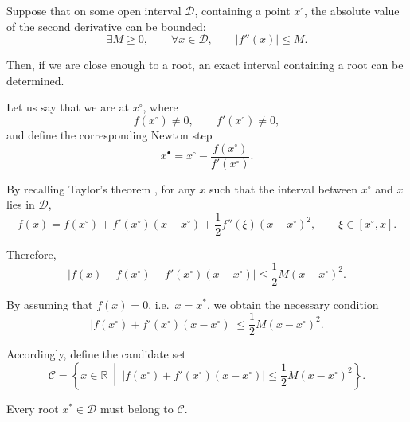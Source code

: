 \documentclass{article}
\theoremstyle{definition}
\begin{document}
Suppose that on some open interval $\mathcal{D}$, containing a point
$x^\circ$, the absolute value of the second derivative can be bounded:
\begin{equation}
    \exists M\geq 0,
    \qquad
    \forall x\in\mathcal{D},
    \qquad
    |f''(x)|\leq M.
\end{equation}

Then, if we are close enough to a root, an exact interval containing a
root can be determined.

Let us say that we are at $x^\circ$, where
\begin{equation}
    f(x^\circ)\neq 0,
    \qquad
    f'(x^\circ)\neq 0,
\end{equation}
and define the corresponding Newton step
\begin{equation}
    x^\bullet
    =
    x^\circ-\frac{f(x^\circ)}{f'(x^\circ)}.
\end{equation}

By recalling Taylor's theorem \cite{book:Rudin}, for any $x$ such that
the interval between $x^\circ$ and $x$ lies in $\mathcal{D}$,
\begin{equation}
    f(x)
    =
    f(x^\circ)
    +
    f'(x^\circ)(x-x^\circ)
    +
    \frac{1}{2}f''(\xi)(x-x^\circ)^2,
    \qquad
    \xi\in[x^\circ,x].
\end{equation}

Therefore,
\begin{equation}
    \left|
        f(x)
        -
        f(x^\circ)
        -
        f'(x^\circ)(x-x^\circ)
    \right|
    \leq
    \frac{1}{2}M(x-x^\circ)^2.
\end{equation}

By assuming that $f(x)=0$, i.e.\ $x=x^*$, we obtain the necessary
condition
\begin{equation}
    \left|
        f(x^\circ)
        +
        f'(x^\circ)(x-x^\circ)
    \right|
    \leq
    \frac{1}{2}M(x-x^\circ)^2.
\end{equation}

Accordingly, define the candidate set
\begin{equation}
    \mathcal{C}
    =
    \left\{
        x\in\mathbb{R}
        \ \middle|\
        \left|
            f(x^\circ)
            +
            f'(x^\circ)(x-x^\circ)
        \right|
        \leq
        \frac{1}{2}M(x-x^\circ)^2
    \right\}.
\end{equation}

Every root $x^*\in\mathcal{D}$ must belong to $\mathcal{C}$.
\end{document}
